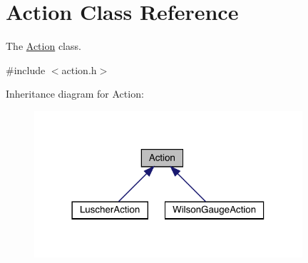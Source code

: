 \hypertarget{class_action}{}\section{Action Class Reference}
\label{class_action}


The \mbox{\hyperlink{class_action}{Action}} class.  




{\ttfamily \#include $<$action.\+h$>$}



Inheritance diagram for Action\+:
\nopagebreak
\begin{figure}[H]
\begin{center}
\leavevmode
\includegraphics[width=282pt]{class_action__inherit__graph}
\end{center}
\end{figure}
